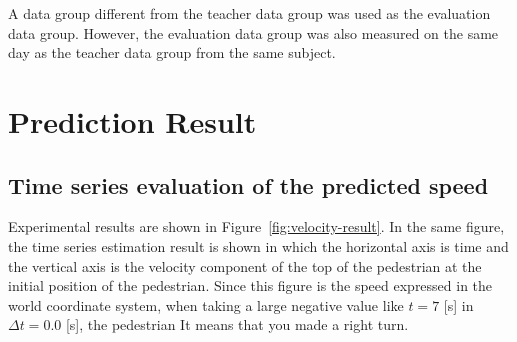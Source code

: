\documentclass{sigchi}
\begin{document}
A data group different from the teacher data group was used as the evaluation data group. However, the evaluation data group was also measured on the same day as the teacher data group from the same subject.


\section{Prediction Result}%

\subsection {Time series evaluation of the predicted speed}

Experimental results are shown in Figure~\ref{fig:velocity-result}. In the same figure, the time series estimation result is shown in which the horizontal axis is time and the vertical axis is the velocity component of the top of the pedestrian at the initial position of the pedestrian. Since this figure is the speed expressed in the world coordinate system, when taking a large negative value like $ t = 7 $ [s] in $ \Delta t = 0.0 $ [s], the pedestrian It means that you made a right turn.

\end{document}
